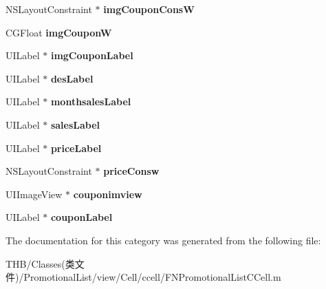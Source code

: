 \begin{DoxyCompactItemize}
\item 
\mbox{\label{category_f_n_promotional_list_c_cell_07_08_a5be74257289ca48cea0f50f5dbb68e9a}} 
N\+S\+Layout\+Constraint $\ast$ {\bfseries img\+Coupon\+ConsW}
\item 
\mbox{\label{category_f_n_promotional_list_c_cell_07_08_ab7892c6c9db56c2c82b31d11269d5549}} 
C\+G\+Float {\bfseries img\+CouponW}
\item 
\mbox{\label{category_f_n_promotional_list_c_cell_07_08_a3a4f1ada4598321754d2e60cc56da59c}} 
U\+I\+Label $\ast$ {\bfseries img\+Coupon\+Label}
\item 
\mbox{\label{category_f_n_promotional_list_c_cell_07_08_a697ae012b26433d56910ac8dd80ceb67}} 
U\+I\+Label $\ast$ {\bfseries des\+Label}
\item 
\mbox{\label{category_f_n_promotional_list_c_cell_07_08_ae045634389a4e809f7f4d9f425c7e5ee}} 
U\+I\+Label $\ast$ {\bfseries monthsales\+Label}
\item 
\mbox{\label{category_f_n_promotional_list_c_cell_07_08_a5b26f6eba824a0e37bfd16c52c7f311f}} 
U\+I\+Label $\ast$ {\bfseries sales\+Label}
\item 
\mbox{\label{category_f_n_promotional_list_c_cell_07_08_adc8cf0a45e00e2b168e71f04fa3b2b86}} 
U\+I\+Label $\ast$ {\bfseries price\+Label}
\item 
\mbox{\label{category_f_n_promotional_list_c_cell_07_08_afc604d94e07f09048a5f9c8ef371b4c0}} 
N\+S\+Layout\+Constraint $\ast$ {\bfseries price\+Consw}
\item 
\mbox{\label{category_f_n_promotional_list_c_cell_07_08_ad91e97312571d581fa1754ebbeeb2f30}} 
U\+I\+Image\+View $\ast$ {\bfseries couponimview}
\item 
\mbox{\label{category_f_n_promotional_list_c_cell_07_08_a11d0b320805bd924806d485662f3e217}} 
U\+I\+Label $\ast$ {\bfseries coupon\+Label}
\end{DoxyCompactItemize}


The documentation for this category was generated from the following file\+:\begin{DoxyCompactItemize}
\item 
T\+H\+B/\+Classes(类文件)/\+Promotional\+List/view/\+Cell/ccell/F\+N\+Promotional\+List\+C\+Cell.\+m\end{DoxyCompactItemize}
